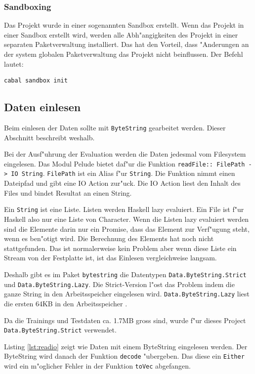\documentclass[a4paper, 12pt]{article}
\begin{document}
\subsubsection{Sandboxing}
\label{sec:sanboxing}

Das Projekt wurde in einer sogenannten Sandbox erstellt. Wenn das Projekt in einer Sandbox erstellt wird, werden alle Abh"angigkeiten des Projekt in einer separaten Paketverwaltung installiert. Das hat den Vorteil, dass "Anderungen an der system globalen Paketverwaltung das Projekt nicht beinflussen. Der Befehl lautet:
\begin{verbatim}
cabal sandbox init
\end{verbatim}

\subsection{Daten einlesen}
\label{sec:readio}

Beim einlesen der Daten sollte mit \verb|ByteString| gearbeitet werden. Dieser Abschnitt beschreibt weshalb.

Bei der Ausf"uhrung der Evaluation werden die Daten jedesmal vom Filesystem eingelesen. Das Modul Pelude bietet daf"ur die Funktion \verb|readFile:: FilePath -> IO String|. \verb|FilePath| ist ein Alias f"ur \verb|String|. Die Funktion nimmt einen Dateipfad und gibt eine IO Action zur"uck. Die IO Action liest den Inhalt des Files und bindet Resultat an einen String.

Ein \verb|String| ist eine Liste. Listen werden Haskell lazy evaluiert. Ein File ist f"ur Haskell also nur eine Liste von Character. Wenn die Listen lazy evaluiert werden sind die Elemente darin nur ein Promise, dass das Element zur Verf"ugung steht, wenn es ben"otigt wird. Die Berechnung des Elements hat noch nicht stattgefunden. Das ist normalerweise kein Problem aber wenn diese Liste ein Stream von der Festplatte ist, ist das Einlesen vergleichweise langsam.

Deshalb gibt es im Paket \verb|bytestring| die Datentypen \verb|Data.ByteString.Strict| und \verb|Data.ByteString.Lazy|. Die Strict-Version l"ost das Problem indem die ganze String in den Arbeitsspeicher eingelesen wird. \verb|Data.ByteString.Lazy| liest die ersten 64KB in den Arbeitsspeicher \cite{Lipovaca}.

Da die Trainings und Testdaten ca. 1.7MB gross sind, wurde f"ur dieses Project \verb|Data.ByteString.Strict| verwendet.

Listing \ref{lst:readio} zeigt wie Daten mit einem ByteString eingelesen werden. Der ByteString wird danach der Funktion \verb|decode| "ubergeben. Das diese ein \verb|Either| wird ein m"oglicher Fehler in der Funktion \verb|toVec| abgefangen.
\end{document}
